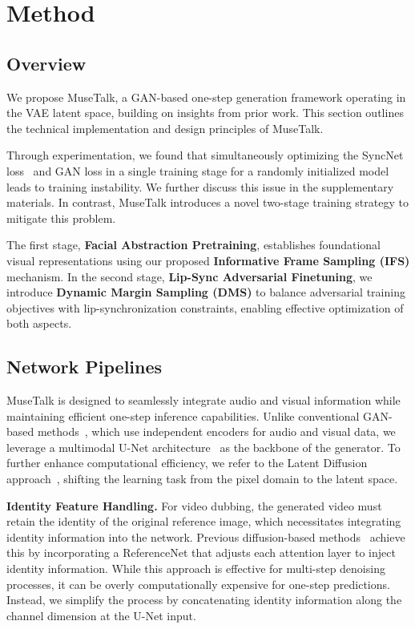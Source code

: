 \section{Method}
\label{sec:method}

\subsection{Overview}
\label{subsec:method_1}
We propose MuseTalk, a GAN-based one-step generation framework operating in the VAE latent space, building on insights from prior work. This section outlines the technical implementation and design principles of MuseTalk.

Through experimentation, we found that simultaneously optimizing the SyncNet loss~\cite{prajwal2020lip} and GAN loss in a single training stage for a randomly initialized model leads to training instability. We further discuss this issue in the supplementary materials. In contrast, MuseTalk introduces a novel two-stage training strategy to mitigate this problem.

The first stage, \textbf{Facial Abstraction Pretraining}, establishes foundational visual representations using our proposed \textbf{Informative Frame Sampling (IFS) }mechanism. In the second stage, \textbf{Lip-Sync Adversarial Finetuning}, we introduce \textbf{Dynamic Margin Sampling (DMS)} to balance adversarial training objectives with lip-synchronization constraints, enabling effective optimization of both aspects.

\subsection{Network Pipelines}
\label{subsec:method_2}
MuseTalk is designed to seamlessly integrate audio and visual information while maintaining efficient one-step inference capabilities. 
Unlike conventional GAN-based methods~\cite{prajwal2020lip, wang2023seeing}, which use independent encoders for audio and visual data, we leverage a multimodal U-Net architecture~\cite{ronneberger2015u} as the backbone of the generator. 
To further enhance computational efficiency, we refer to the Latent Diffusion approach~\cite{rombach2022high}, shifting the learning task from the pixel domain to the latent space.

\noindent \textbf{Identity Feature Handling.}
For video dubbing, the generated video must retain the identity of the original reference image, which necessitates integrating identity information into the network. 
Previous diffusion-based methods~\cite{tian2024emo, jiang2024loopy} achieve this by incorporating a ReferenceNet that adjusts each attention layer to inject identity information. 
While this approach is effective for multi-step denoising processes, it can be overly computationally expensive for one-step predictions.
Instead, we simplify the process by concatenating identity information along the channel dimension at the U-Net input.

